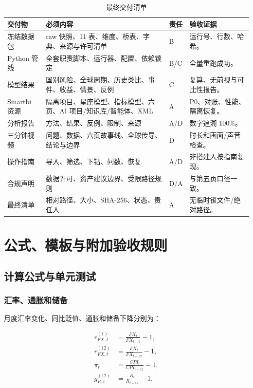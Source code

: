 \documentclass[UTF8,fontset=windows,12pt,openany]{ctexbook}
\begin{document}
\begin{longtable}{p{4.2cm}p{4.3cm}p{2.5cm}p{3.2cm}}
\caption{最终交付清单}\label{tab:handoff}\\
\toprule
\textbf{交付物} & \textbf{必须内容} & \textbf{责任} & \textbf{验收证据}\\
\midrule
冻结数据包 & raw 快照、11 表、维度、桥表、字典、来源与许可清单 & B & 运行号、行数、哈希。\\
Python 管线 & 全套职责脚本、运行器、配置、依赖锁定 & B/C & 全量重跑成功。\\
模型结果 & 国别风险、全球周期、历史类比、事件、收益、情景、反例 & C & 复算、无前视与可比性报告。\\
Smartbi 资源 & 隔离项目、星座模型、指标模型、六页、AI 项目/知识库/智能体、XML & A & P0、对账、性能、隔离恢复。\\
分析报告 & 方法、结果、反例、限制、来源 & A/D & 数字追溯 100\%。\\
三分钟视频 & 问题、数据、六页故事线、全球传导、结论与边界 & D & 时长和画面/声音检查。\\
操作指南 & 导入、筛选、下钻、问数、恢复 & A/D & 非搭建人按指南复现。\\
合规声明 & 数据许可、资产建议边界、受限路径规则 & D/A & 与第五页口径一致。\\
最终清单 & 相对路径、大小、SHA-256、状态、责任人 & A & 无临时锁文件/绝对路径。\\
\bottomrule
\end{longtable}

\part{公式、模板与附加验收规则}

\chapter{计算公式与单元测试}

\section{汇率、通胀和储备}

月度汇率变化、同比贬值、通胀和储备下降分别为：

\begin{align}
r_{FX,t}^{(1)} &= \frac{FX_t}{FX_{t-1}}-1,\\
r_{FX,t}^{(12)} &= \frac{FX_t}{FX_{t-12}}-1,\\
\pi_t &= \frac{CPI_t}{CPI_{t-12}}-1,\\
g_{R,t}^{(12)} &= \frac{R_t}{R_{t-12}}-1.
\end{align}
\end{document}
